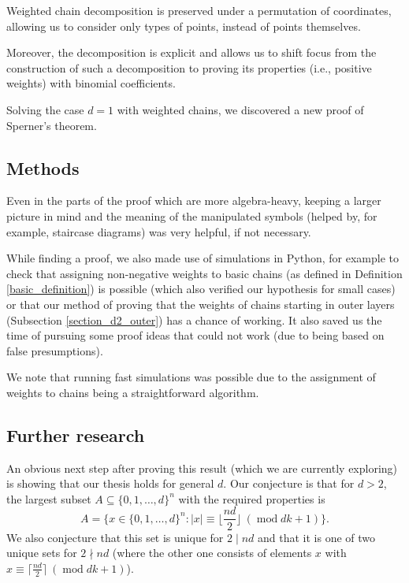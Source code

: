 \documentclass[11pt, reqno]{amsart}
\numberwithin{equation}{section}
\newcommand\modd{\operatorname{mod}}
\begin{document}
Weighted chain decomposition is preserved under a permutation of coordinates, allowing us to consider only types of points, instead of points themselves.

Moreover, the decomposition is explicit and allows us to shift focus from the construction of such a decomposition to proving its properties (i.e., positive weights) with binomial coefficients.

Solving the case $d=1$ with weighted chains, we discovered a new proof of Sperner's theorem.

\subsection{Methods}

Even in the parts of the proof which are more algebra-heavy, keeping a larger picture in mind and the meaning of the manipulated symbols (helped by, for example, staircase diagrams) was very helpful, if not necessary.

While finding a proof, we also made use of simulations in Python, for example to check that assigning non-negative weights to basic chains (as defined in Definition \ref{basic_definition}) is possible (which also verified our hypothesis for small cases) or that our method of proving that the weights of chains starting in outer layers (Subsection \ref{section_d2_outer}) has a chance of working. It also saved us the time of pursuing some proof ideas that could not work (due to being based on false presumptions).

We note that running fast simulations was possible due to the assignment of weights to chains being a straightforward algorithm.

\subsection{Further research}

An obvious next step after proving this result (which we are currently exploring) is showing that our thesis holds for general $d$. Our conjecture is that for $d>2$, the largest subset $A \subseteq \{0, 1, \dots, d\}^n$ with the required properties is
\begin{equation}
    A = \Big\{ x \in \{0, 1, \dots, d\}^n : |x| \equiv \Big\lfloor \frac{nd}{2} \Big\rfloor \ (\modd dk+1) \Big\}.
\end{equation}
We also conjecture that this set is unique for $2 \mid nd$ and that it is one of two unique sets for $2 \nmid nd$ (where the other one consists of elements $x$ with $x \equiv \Big\lceil \frac{nd}{2} \Big\rceil \ (\modd dk+1)$).
\end{document}
